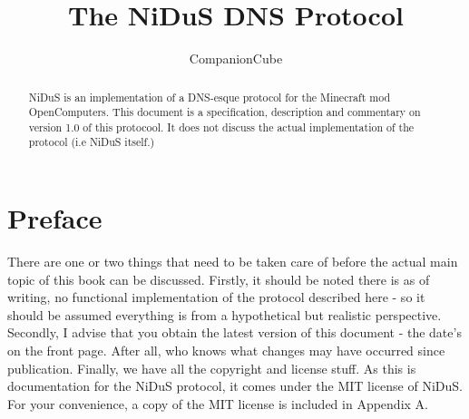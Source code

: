 \documentclass[]{report}
\title{The NiDuS DNS Protocol}
\author{CompanionCube}
\begin{document}
\maketitle

\begin{abstract}
NiDuS is an implementation of a DNS-esque protocol for the Minecraft mod OpenComputers. This document is a specification, description and commentary on version 1.0 of this protocool. It does not discuss the actual implementation of the protocol (i.e NiDuS itself.)
\end{abstract}

\chapter{Preface}
There are one or two things that need to be taken care of before the actual main topic of this book can be discussed. Firstly, it should be noted there is as of writing, no functional implementation of the protocol described here - so it should be assumed everything is from a hypothetical but realistic perspective. Secondly, I advise that you obtain the latest version of this document - the date's on the front page. After all, who knows what changes may have occurred since publication. Finally, we have all the copyright and license stuff. As this is documentation for the NiDuS protocol, it comes under the MIT license of NiDuS. For your convenience, a copy of the MIT license is included in Appendix A.
\end{document}
